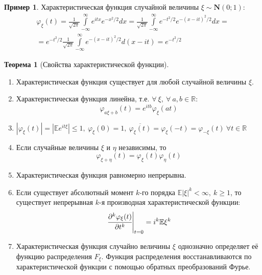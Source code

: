 \documentclass[oneside,final,14pt]{extreport}
\theoremstyle{plain}
\theoremstyle{definition}
\newtheorem*{exmp}{Пример}
\theoremstyle{named}
\newtheorem*{namedthm}{Теорема}
\begin{document}
\begin{exmp}
    Характеристическая функция случайной величины $\xi \sim \mathbf{N}(0;1)$:
    \begin{multline*}
        \varphi_{\xi}(t) 
        = \frac{1}{\sqrt{2 \pi}} \int\limits_{-\infty}^{\infty} e^{i t x} e^{-x^{2} / 2} d x
        = \frac{1}{\sqrt{2 \pi}} \int\limits_{-\infty}^{\infty} e^{-t^{2} / 2} e^{-(x-i t)^{2} / 2} d x = \\ 
        = e^{-t^{2} / 2} \frac{1}{\sqrt{2 \pi}} \int\limits_{-\infty}^{\infty} e^{-(x-i t)^{2} / 2} d(x-i t)
        = e^{-t^{2} / 2}
    \end{multline*}
\end{exmp}

\begin{namedthm}[Свойства характеристической функции]\leavevmode
    \begin{enumerate}
        \item Характеристическая функция существует для любой случайной величины $\xi$.
        \item Характеристическая функция линейна, т.е. $\forall~ \xi,~ \forall~ a, b \in \mathbb{R}$:
        \begin{equation*}
            \varphi_{a \xi + b}(t) = e^{itb} \varphi_{\xi}(at)
        \end{equation*}
        \item $|\varphi_{\xi}(t)|=|\mathbb{E} e^{i t \xi}| \leqslant 1,~ \varphi_{\xi}(0) = 1, ~\overline{\varphi_{\xi}(t)} = \varphi_{\xi}(-t) = \varphi_{-\xi}(t) ~\forall t \in \mathbb{R}$
        \item Если случайные величины $\xi$ и $\eta$ независимы, то
        \begin{equation*}
            \varphi_{\xi + \eta}(t) = \varphi_{\xi}(t) \varphi_{\eta}(t)
        \end{equation*}
        \item Характеристическая функция равномерно непрерывна.
        \item Если существует абсолютный момент $k$-го порядка $\mathbb{E}|\xi|^{k} < \infty,~ k \geqslant 1$, то существует непрерывная $k$-я производная характеристической функции:
        \begin{equation*}
            \left.\cfrac{\partial^{k} \varphi_{\xi}(t)}{\partial t^{k}}\right|_{t=0}= i^{k} \mathbb{E} \xi^{k}
        \end{equation*}
        \item Характеристическая функция случайно величины $\xi$ однозначно определяет её функцию распределения $F_{\xi}$. Функция распределения восстанавливаются по характеристической функции с помощью обратных преобразований Фурье.
        

\end{enumerate}
\end{namedthm}
\end{document}
